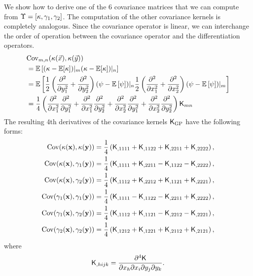 We show how to derive one of the 6  covariance matrices that we can compute
from $\Upsilon = [\kappa, \gamma_1, \gamma_2]$. The computation of the other
covariance kernels is completely analogous.
Since the covariance operator is linear, we can interchange the order of
operation between the covariance operator and the differentiation operators. 
\begin{align*}
&{\rm Cov}_{m,n} (\kappa(\vec{x}), \kappa(\vec{y}))  \\ 
&= \mathbb{E} \left[ 
	(\kappa - \mathbb{E}[\kappa])|_m 
( \kappa - \mathbb{E}[\kappa])|_n\right] 
\\
 &=\mathbb{E}\left[
\frac{1}{2} \left(\frac{\partial^2}{\partial y_1^2} + 
\frac{\partial^2}{\partial y_2^2}\right) 
 (\psi - \mathbb{E}\left[\psi\right])|_n \frac{1}{2}
\left(\frac{\partial^2}{\partial x_1^2} + \frac{\partial^2}{\partial x_2^2} \right)
(\psi - \mathbb{E}\left[\psi\right])|_m \right]
\\
&= \frac{1}{4}\left(
\frac{\partial^2}{\partial x_1^2} \frac{\partial^2}{\partial y_1^2} + 
\frac{\partial^2}{\partial x_1^2} \frac{\partial^2}{\partial y_2^2} +  
\frac{\partial^2}{\partial x_2^2} \frac{\partial^2}{\partial y_1^2} + 
\frac{\partial^2}{\partial x_2^2} \frac{\partial^2}{\partial y_2^2}  
\right) \mathsf{K}_{mn}\\ 
\end{align*}
The resulting 4th derivatives of the covariance
kernels $\mathsf{K}_{\rm GP}$ have the following forms: 
\begin{align}
	\mathrm{Cov} (\kappa(\mathbf{x}), \kappa(\mathbf{y}))
&= \frac{1}{4}\left(
\mathsf{K}_{,1111} + \mathsf{K}_{,1122} + \mathsf{K}_{,2211} + \mathsf{K}_{,2222}
\right), \label{eq:kernel_derivatives1}\\
\mathrm{Cov}(\kappa(\mathbf{x}), \gamma_1(\mathbf{y})) &= \frac{1}{4}\left(
\mathsf{K}_{,1111} + \mathsf{K}_{,2211} - \mathsf{K}_{,1122} - \mathsf{K}_{,2222}
\right), \\
\mathrm{Cov}(\kappa(\mathbf{x}), \gamma_2(\mathbf{y})) &= \frac{1}{4}\left(
\mathsf{K}_{,1112} + \mathsf{K}_{,2212} + \mathsf{K}_{,1121} + \mathsf{K}_{,2221}
\right),\\
\mathrm{Cov}(\gamma_1(\mathbf{x}), \gamma_1(\mathbf{y})) &= \frac{1}{4}\left(
\mathsf{K}_{,1111} - \mathsf{K}_{,1122} - \mathsf{K}_{,2211} + \mathsf{K}_{,2222}
\right), \\
\mathrm{Cov}(\gamma_1(\mathbf{x}), \gamma_2(\mathbf{y})) &= \frac{1}{4}\left(
\mathsf{K}_{,1112} + \mathsf{K}_{,1121} - \mathsf{K}_{,2212} - \mathsf{K}_{,2221}
\right), \\
\mathrm{Cov}(\gamma_2(\mathbf{x}), \gamma_2(\mathbf{y})) &= \frac{1}{4}\left(
\mathsf{K}_{,1212} + \mathsf{K}_{,1221} + \mathsf{K}_{,2112} + \mathsf{K}_{,2121}
\right), \label{eq:kernel_derivatives2}
\end{align}
where
\begin{equation}
	\mathsf{K}_{,hijk} = \frac{\partial^4 \mathsf{K}}{\partial x_h \partial x_i
	\partial y_j \partial y_k}.
\end{equation}

